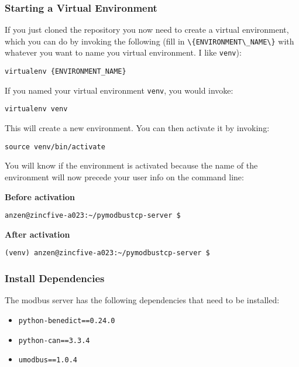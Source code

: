 \documentclass[10pt,]{article}
\newcommand{\passthrough}[1]{#1}
\providecommand{\tightlist}{%
	\setlength{\itemsep}{0pt}\setlength{\parskip}{0pt}}
\begin{document}
\hypertarget{starting-a-virtual-environment}{%
\subsubsection{Starting a Virtual
Environment}\label{starting-a-virtual-environment}}

If you just cloned the repository you now need to create a virtual
environment, which you can do by invoking the following (fill in
\passthrough{\lstinline!\{ENVIRONMENT\_NAME\}!} with whatever you want
to name you virtual environment. I like \passthrough{\lstinline!venv!}):

\begin{lstlisting}
virtualenv {ENVIRONMENT_NAME}
\end{lstlisting}

If you named your virtual environment \passthrough{\lstinline!venv!},
you would invoke:

\begin{lstlisting}
virtualenv venv
\end{lstlisting}

This will create a new environment. You can then activate it by
invoking:

\begin{lstlisting}
source venv/bin/activate
\end{lstlisting}

You will know if the environment is activated because the name of the
environment will now precede your user info on the command line:

\textbf{Before activation}

\begin{lstlisting}
anzen@zincfive-a023:~/pymodbustcp-server $
\end{lstlisting}

\textbf{After activation}

\begin{lstlisting}
(venv) anzen@zincfive-a023:~/pymodbustcp-server $
\end{lstlisting}

\hypertarget{install-dependencies}{%
\subsubsection{Install Dependencies}\label{install-dependencies}}

The modbus server has the following dependencies that need to be
installed:

\begin{itemize}
\tightlist
\item
  \passthrough{\lstinline!python-benedict==0.24.0!}
\item
  \passthrough{\lstinline!python-can==3.3.4!}
\item
  \passthrough{\lstinline!umodbus==1.0.4!}
\end{itemize}
\end{document}
